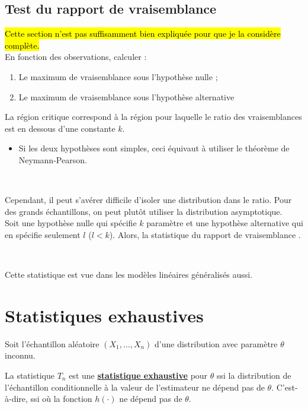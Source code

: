 \documentclass[10pt, french]{article}
\begin{document}
\begin{multicols*}{2}
\columnbreak
\subsection{Test du rapport de vraisemblance}
\hl{Cette section n'est pas suffisamment bien expliquée pour que je la considère complète.}\\

En fonction des observations, calculer :
\begin{enumerate}
	\item	Le maximum de vraisemblance sous l'hypothèse nulle ;
	\item	Le maximum de vraisemblance sous l'hypothèse alternative
\end{enumerate}
La région critique correspond à la région pour laquelle le ratio des vraisemblances est en dessous d'une constante $k$.
\begin{itemize}
	\item	Si les deux hypothèses sont simples, ceci équivaut à utiliser le théorème de Neymann-Pearson.
\end{itemize}
\

Cependant, il peut s'avérer difficile d'isoler une distribution dans le ratio. Pour des grands échantillons, on peut plutôt utiliser la distribution asymptotique.\\
Soit une hypothèse nulle qui spécifie $k$ paramètre et une hypothèse alternative qui en spécifie seulement $l$ ($l < k$). Alors, la statistique du rapport de vraisemblance .

\

Cette statistique est vue dans les modèles linéaires généralisés aussi.




\newpage
\section{Statistiques exhaustives}\label{sec:exhStat}
Soit l'échantillon aléatoire $(X_{1}, \dots, X_{n})$ d'une distribution avec paramètre $\theta$ inconnu.

\begin{definitionNOHFILL}
La statistique $T_{n}$ est une \underline{\textbf{statistique exhaustive}} pour $\theta$ ssi la distribution de l'échantillon conditionnelle à la valeur de l'estimateur ne dépend pas de $\theta$. C'est-à-dire, ssi  où la fonction $h(\cdot)$ ne dépend pas de $\theta$.	\\


\end{definitionNOHFILL}
\end{multicols*}
\end{document}
